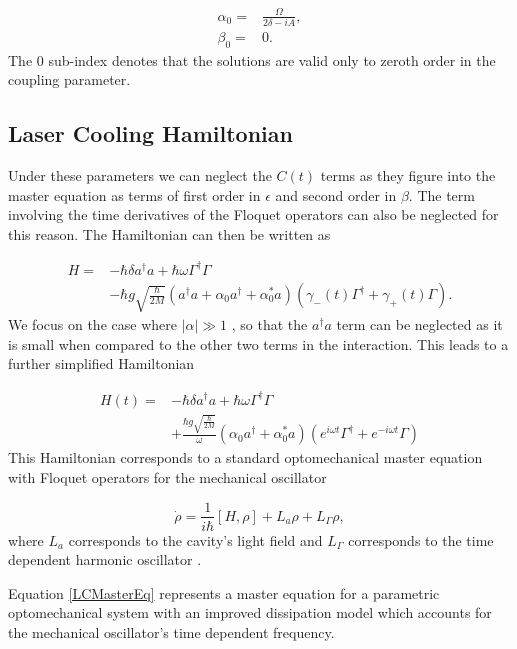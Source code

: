 \documentclass[reprint, amsmath,amssymb, aps,pra]{revtex4-1}
\begin{document}
\begin{align}
\alpha_0 =& \frac{\Omega}{2\delta-iA},\\
\beta_0 =& 0.
\end{align} The 0 sub-index denotes that the solutions are valid only to zeroth order in the coupling parameter. 

\subsection{Laser Cooling Hamiltonian}

Under these parameters we can neglect the $C(t)$ terms as they
figure into the
master equation as terms of first order in $\epsilon$ and second order
in $\beta$. The term involving the time derivatives of the Floquet
operators can also be neglected for this reason. The Hamiltonian can
then be written as

\begin{align}
H =& -\hbar \delta a^{\dagger}a +\hbar\omega\Gamma^{\dagger}\Gamma \\
&-\hbar g\sqrt{\frac{\hbar}{2M}}(a^{\dagger}a +\alpha_0 a^{\dagger}+\alpha^*_0 a)(\gamma_-(t)\Gamma^{\dagger}+\gamma_+(t)\Gamma)\nonumber.
\end{align} We focus on the case where $|\alpha| \gg 1$
\cite{BarberisLC}, so that the $a^\dagger a$ term can be neglected as
it is small when compared to the other two terms in the interaction.
This leads to a further simplified Hamiltonian

\begin{align} \label{LCHamiltonian}
H(t) =& -\hbar \delta a^{\dagger}a +\hbar\omega\Gamma^{\dagger}\Gamma \\
&+\frac{\hbar g\sqrt{\frac{\hbar}{2M}}}{\omega}(\alpha_0 a^{\dagger}+\alpha^*_0 a)(e^{i\omega t} \nonumber\Gamma^{\dagger}+e^{-i\omega t}\Gamma)
\end{align}
This Hamiltonian corresponds to a standard optomechanical master
equation with Floquet operators for the mechanical oscillator


\begin{equation}\label{LCMasterEq}
\dot{\rho} = \frac{1}{i\hbar}[H,\rho] +L_a\rho + L_\Gamma \rho,
\end{equation} where $L_a$ corresponds to the cavity's light field \cite{ZollerQN} and $L_\Gamma$ corresponds to the time dependent harmonic oscillator \cite{HanngiFM}.

Equation \eqref{LCMasterEq} represents a master equation for a parametric optomechanical system with an improved dissipation model which accounts for the mechanical oscillator's time dependent frequency.
\end{document}
